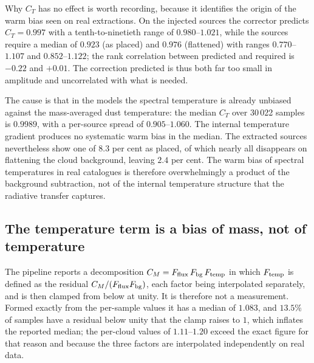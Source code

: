 \documentclass[11pt,a4paper]{article}
\begin{document}
Why $C_T$ has no effect is worth recording, because it identifies the origin of
the warm bias seen on real extractions. On the injected sources the corrector
predicts $C_T=0.997$ with a tenth-to-ninetieth range of $0.980$--$1.021$, while
the sources require a median of $0.923$ (as placed) and $0.976$ (flattened)
with ranges $0.770$--$1.107$ and $0.852$--$1.122$; the rank correlation between
predicted and required is $-0.22$ and $+0.01$. The correction predicted is thus
both far too small in amplitude and uncorrelated with what is needed.

The cause is that in the models the spectral temperature is already unbiased
against the mass-averaged dust temperature: the median $C_T$ over 30\,022
samples is $0.9989$, with a per-source spread of $0.905$--$1.060$. The internal
temperature gradient produces no systematic warm bias in the median. The
extracted sources nevertheless show one of $8.3$ per cent as placed, of which
nearly all disappears on flattening the cloud background, leaving $2.4$ per
cent. The warm bias of spectral temperatures in real catalogues is therefore
overwhelmingly a product of the background subtraction, not of the internal
temperature structure that the radiative transfer captures. 


\subsection{The temperature term is a bias of mass, not of temperature}
\label{sec:practice-temperature}

The pipeline reports a decomposition $C_M = F_{\rm flux}\,F_{\rm bg}\,F_{\rm
temp}$ in which $F_{\rm temp}$ is defined as the residual $C_M/(F_{\rm flux}
F_{\rm bg})$, each factor being interpolated separately, and is then clamped
from below at unity. It is therefore not a measurement. Formed exactly from the
per-sample values it has a median of $1.083$, and $13.5$\% of samples have a
residual below unity that the clamp raises to $1$, which inflates the reported
median; the per-cloud values of $1.11$--$1.20$ exceed the exact figure for that
reason and because the three factors are interpolated independently on real
data.
\end{document}
